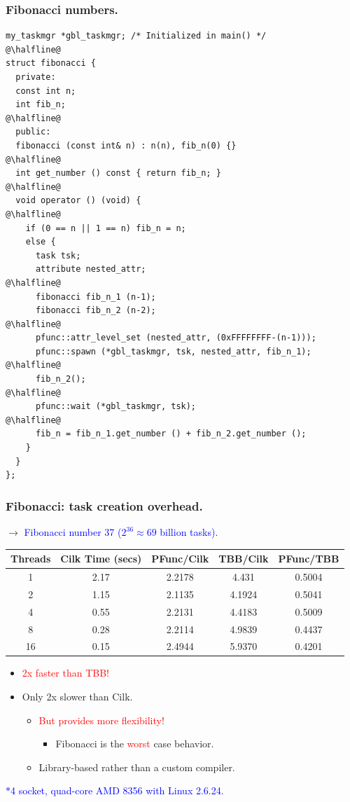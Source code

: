\documentclass{beamer}
\newcommand{\tablefont}{\fontsize{8}{13}\selectfont}
\begin{document}
\begin{frame}[fragile]
\frametitle{Fibonacci numbers.}
\begin{center}
\begin{minipage}{0.60\textwidth}
\begin{lstlisting}
my_taskmgr *gbl_taskmgr; /* Initialized in main() */
@\halfline@
struct fibonacci {
  private:
  const int n;
  int fib_n;
@\halfline@
  public:
  fibonacci (const int& n) : n(n), fib_n(0) {}
@\halfline@
  int get_number () const { return fib_n; }
@\halfline@
  void operator () (void) {
@\halfline@
    if (0 == n || 1 == n) fib_n = n;
    else {
      task tsk; 
      attribute nested_attr;
@\halfline@
      fibonacci fib_n_1 (n-1);
      fibonacci fib_n_2 (n-2);
@\halfline@
      pfunc::attr_level_set (nested_attr, (0xFFFFFFFF-(n-1)));
      pfunc::spawn (*gbl_taskmgr, tsk, nested_attr, fib_n_1);
@\halfline@
      fib_n_2();
@\halfline@
      pfunc::wait (*gbl_taskmgr, tsk);
@\halfline@
      fib_n = fib_n_1.get_number () + fib_n_2.get_number ();
    }
  }
};
\end{lstlisting}
\end{minipage}
\end{center}
\end{frame}

\begin{frame}[fragile]
\frametitle{Fibonacci: task creation overhead.}
$\rightarrow{}$ \textcolor{blue}{Fibonacci number 37 ($2^{36}\approx{}69$ billion tasks).}
\tablefont
\begin{center}
\begin{tabular}{|c|c|c|c|c|} 
\hline
Threads & Cilk Time (secs) & PFunc/Cilk & TBB/Cilk & PFunc/TBB \\
\hline
1  & 2.17 & 2.2178  & 4.431 & 0.5004 \\ 
\hline
2  & 1.15 & 2.1135 & 4.1924 & 0.5041 \\ 
\hline
4  & 0.55 & 2.2131 & 4.4183 & 0.5009 \\ 
\hline
8  & 0.28 & 2.2114 & 4.9839 & 0.4437 \\ 
\hline
16 & 0.15 & 2.4944 & 5.9370 & 0.4201 \\ 
\hline
\end{tabular}
\end{center}
\normalsize
\begin{itemize}
\item \textcolor{red}{2x faster than TBB!}
\item Only 2x slower than Cilk.
  \begin{itemize}
  \item \textcolor{red}{But provides more flexibility!}
    \begin{itemize}
    \item Fibonacci is the \textcolor{red}{worst} case behavior.
    \end{itemize}
  \item Library-based rather than a custom compiler.
  \end{itemize}
\end{itemize}
\tiny\textcolor{blue}{$\ast{}$4 socket, quad-core AMD 8356 with Linux 2.6.24.}\normalsize
\end{frame}
\end{document}
